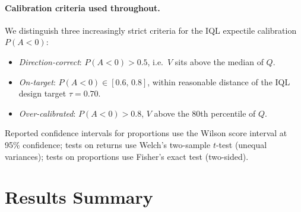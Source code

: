 \documentclass[10pt,a4paper]{article}
\begin{document}
\paragraph{Calibration criteria used throughout.}
We distinguish three increasingly strict criteria for the IQL expectile
calibration $P(A<0)$:
\begin{itemize}
  \item \emph{Direction-correct}: $P(A<0)>0.5$, i.e.\ $V$ sits above the
        median of $Q$.
  \item \emph{On-target}: $P(A<0)\in[0.6,\,0.8]$, within reasonable distance
        of the IQL design target $\tau=0.70$.
  \item \emph{Over-calibrated}: $P(A<0)>0.8$, $V$ above the 80th percentile
        of $Q$.
\end{itemize}
Reported confidence intervals for proportions use the Wilson score interval
at 95\% confidence; tests on returns use Welch's two-sample $t$-test (unequal
variances); tests on proportions use Fisher's exact test (two-sided).

\section{Results Summary}
\end{document}
